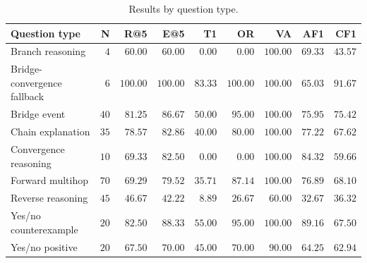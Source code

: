 \begin{table}[t]
    \centering
    \scriptsize
    \caption{Results by question type.}
    \label{tab:question-type-results}
    \begin{tabular}{lrrrrrrrr}
        \hline
        \textbf{Question type} &
        \textbf{N} &
        \textbf{R@5} &
        \textbf{E@5} &
        \textbf{T1} &
        \textbf{OR} &
        \textbf{VA} &
        \textbf{AF1} &
        \textbf{CF1} \\
        \hline
        Branch reasoning &
        \(4\) &
        \(60.00\) &
        \(60.00\) &
        \(0.00\) &
        \(0.00\) &
        \(100.00\) &
        \(69.33\) &
        \(43.57\) \\

        Bridge-convergence fallback &
        \(6\) &
        \(100.00\) &
        \(100.00\) &
        \(83.33\) &
        \(100.00\) &
        \(100.00\) &
        \(65.03\) &
        \(91.67\) \\

        Bridge event &
        \(40\) &
        \(81.25\) &
        \(86.67\) &
        \(50.00\) &
        \(95.00\) &
        \(100.00\) &
        \(75.95\) &
        \(75.42\) \\

        Chain explanation &
        \(35\) &
        \(78.57\) &
        \(82.86\) &
        \(40.00\) &
        \(80.00\) &
        \(100.00\) &
        \(77.22\) &
        \(67.62\) \\

        Convergence reasoning &
        \(10\) &
        \(69.33\) &
        \(82.50\) &
        \(0.00\) &
        \(0.00\) &
        \(100.00\) &
        \(84.32\) &
        \(59.66\) \\

        Forward multihop &
        \(70\) &
        \(69.29\) &
        \(79.52\) &
        \(35.71\) &
        \(87.14\) &
        \(100.00\) &
        \(76.89\) &
        \(68.10\) \\

        Reverse reasoning &
        \(45\) &
        \(46.67\) &
        \(42.22\) &
        \(8.89\) &
        \(26.67\) &
        \(60.00\) &
        \(32.67\) &
        \(36.32\) \\

        Yes/no counterexample &
        \(20\) &
        \(82.50\) &
        \(88.33\) &
        \(55.00\) &
        \(95.00\) &
        \(100.00\) &
        \(89.16\) &
        \(67.50\) \\

        Yes/no positive &
        \(20\) &
        \(67.50\) &
        \(70.00\) &
        \(45.00\) &
        \(70.00\) &
        \(90.00\) &
        \(64.25\) &
        \(62.94\) \\
        \hline
    \end{tabular}
\end{table}

